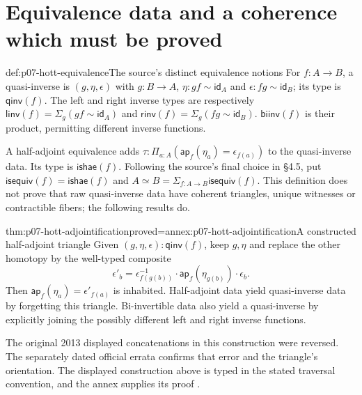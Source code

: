 \section{Equivalence data and a coherence which must be proved}
\label{sec:p07-hott-equivalences}

\begin{hbdefinition}{def:p07-hott-equivalence}{The source's distinct equivalence notions}
For $f:A\to B$, a quasi-inverse is
$(g,\eta,\epsilon)$ with $g:B\to A$, $\eta:g f\sim\mathsf{id}_A$ and
$\epsilon:f g\sim\mathsf{id}_B$; its type is $\mathsf{qinv}(f)$.
The left and right inverse types are respectively
$\mathsf{linv}(f)=\Sigma_g(g f\sim\mathsf{id}_A)$ and
$\mathsf{rinv}(f)=\Sigma_g(f g\sim\mathsf{id}_B)$.
$\mathsf{biinv}(f)$ is their product, permitting different inverse functions.

A half-adjoint equivalence adds
$\tau:\Pi_{a:A}(\mathsf{ap}_f(\eta_a)=\epsilon_{f(a)})$ to the quasi-inverse
data. Its type is $\mathsf{ishae}(f)$. Following the source's final choice
in \S4.5, put $\mathsf{isequiv}(f)=\mathsf{ishae}(f)$ and
$A\simeq B=\Sigma_{f:A\to B}\mathsf{isequiv}(f)$.
This definition does not prove that raw quasi-inverse data have coherent
triangles, unique witnesses or contractible fibers; the following results do.
\end{hbdefinition}

\begin{hbtheorem}{thm:p07-hott-adjointification}{proved=annex:p07-hott-adjointification}{A constructed half-adjoint triangle}
Given $(g,\eta,\epsilon):\mathsf{qinv}(f)$, keep $g,\eta$ and replace
the other homotopy by the well-typed composite
\[
 \epsilon'_b=\epsilon_{f(g(b))}^{-1}\cdot
                     \mathsf{ap}_f(\eta_{g(b)})\cdot\epsilon_b.
\]
Then $\mathsf{ap}_f(\eta_a)=\epsilon'_{f(a)}$ is inhabited.
Half-adjoint data yield quasi-inverse data by forgetting this triangle.
Bi-invertible data also yield a quasi-inverse by explicitly joining the
possibly different left and right inverse functions.
\end{hbtheorem}

The original 2013 displayed concatenations in this construction were
reversed. The separately dated official errata confirms that error and
the triangle's orientation. The displayed construction above is typed in
the stated traversal convention, and the annex supplies its proof
\parencite[\S2.4; \S4.2]{HoTT2013PublicReleaseFoundations}
\parencite[entries for Theorem4.2.3]{HoTTOfficialErrata2023Foundations}.

